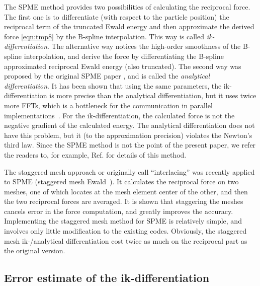 \documentclass[aps,pre,preprint]{revtex4}
\begin{document}
The SPME method provides two possibilities of calculating the
reciprocal force. The first one is to differentiate (with respect to
the particle position) the reciprocal term of the truncated Ewald
energy and then approximate the derived force \eqref{eqn:tmp8} by the
B-spline interpolation. This way is called
\emph{ik-differentiation}.
The alternative way notices the high-order
smoothness of the B-spline interpolation, and derive the force by
differentiating the B-spline approximated reciprocal Ewald energy
(also truncated). The second way was proposed by the original SPME paper
\cite{essmann1995spm}, and is called the \emph{analytical
  differentiation}.
It has been shown that using the same parameters,
the ik-differentiation is more precise than the analytical
differentiation, but it uses twice more FFTs, which is a bottleneck
for the communication in parallel
implementations~\cite{wang2010optimizing}.
For the ik-differentiation, the calculated force is not the negative
gradient of the calculated energy. The analytical differentiation
does not have this problem, but it (to the approximation precision)
violates the Newton's third law.
Since the SPME method is
not the point of the present paper, we refer the readers to, for
example, Ref. \cite{essmann1995spm, deserno1998mue1,
  wang2010optimizing} for details of this method.

The staggered mesh approach or originally call ``interlacing'' was
recently applied to SPME (staggered mesh Ewald~\cite{cerutti2009staggered}).
It calculates the
reciprocal force on two meshes,
one of which locates at the mesh element center
of the other, and then the two reciprocal forces are averaged.
It is shown that staggering the meshes
cancels error in the force computation, and greatly improves the
accuracy.
Implementing the staggered mesh method for SPME is
relatively simple, and involves only little modification to the
existing codes.
Obviously, the staggered mesh ik-/analytical differentiation
cost twice as much on the
reciprocal part as the original version.

\subsection{Error estimate of the ik-differentiation}
\label{sec:error-ik}
\end{document}
